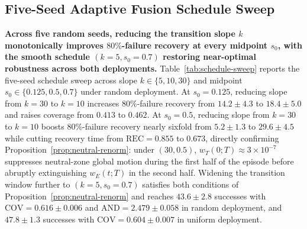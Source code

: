 \documentclass[11pt]{article}
\theoremstyle{plain}
\theoremstyle{definition}
\theoremstyle{remark}
\begin{document}
\subsection{Five-Seed Adaptive Fusion Schedule Sweep}
\label{sec:adaptive-ablation}
\textbf{Across five random seeds, reducing the transition slope $k$ monotonically improves $80\%$-failure recovery at every midpoint $s_0$, with the smooth schedule $(k=5, s_0=0.7)$ restoring near-optimal robustness across both deployments.} Table~\ref{tab:schedule-sweep} reports the five-seed schedule sweep across slope $k \in \{5, 10, 30\}$ and midpoint $s_0 \in \{0.125, 0.5, 0.7\}$ under random deployment. At $s_0 = 0.125$, reducing slope from $k=30$ to $k=10$ increases $80\%$-failure recovery from $14.2 \pm 4.3$ to $18.4 \pm 5.0$ and raises coverage from $0.413$ to $0.462$. At $s_0 = 0.5$, reducing slope from $k=30$ to $k=10$ boosts $80\%$-failure recovery nearly sixfold from $5.2 \pm 1.3$ to $29.6 \pm 4.5$ while cutting recovery time from $\mathrm{REC} = 0.855$ to $0.673$, directly confirming Proposition~\ref{prop:neutral-renorm}: under $(30, 0.5)$, $w_T(0; T) \approx 3 \times 10^{-7}$ suppresses neutral-zone global motion during the first half of the episode before abruptly extinguishing $w_E(t; T)$ in the second half. Widening the transition window further to $(k=5, s_0=0.7)$ satisfies both conditions of Proposition~\ref{prop:neutral-renorm} and reaches $43.6 \pm 2.8$ successes with $\mathrm{COV} = 0.616 \pm 0.006$ and $\mathrm{AND} = 2.479 \pm 0.058$ in random deployment, and $47.8 \pm 1.3$ successes with $\mathrm{COV} = 0.604 \pm 0.007$ in uniform deployment.
\end{document}

